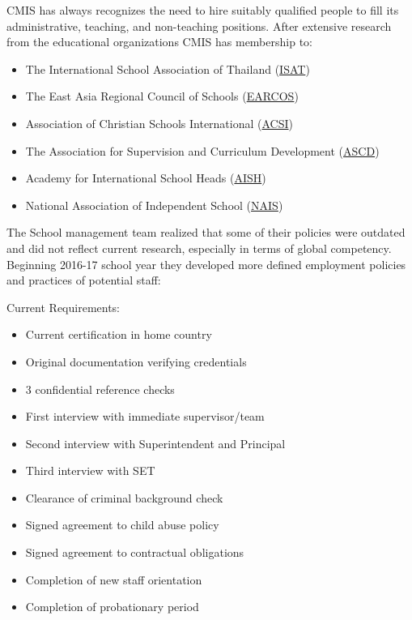 \begin{findings}
CMIS has always recognizes the need to hire suitably qualified people to fill its administrative, teaching, and non-teaching positions. After extensive research from the educational organizations CMIS has membership to:

\begin{itemize}
\item The International School Association of Thailand (\href{http://gallery.cmis.ac.th/2016-2017/ISAT-Regional-Meeting/}{ISAT})
\item The East Asia Regional Council of Schools (\href{https://www.earcos.org/}{EARCOS})
\item Association of Christian Schools International (\href{https://www.acsi.org/}{ACSI})
\item The Association for Supervision and Curriculum Development (\href{http://www.ascd.org/about-ascd.aspx}{ASCD})
\item Academy for International School Heads (\href{http://aishbank.squarespace.com/}{AISH})
\item National Association of Independent School (\href{http://www.nais.org/Pages/default.aspx}{NAIS}) 
\end{itemize}

The School management team realized that some of their policies were outdated and did not reflect current research, especially in terms of global competency. Beginning 2016-17 school year they developed more defined employment policies and practices of potential staff:

Current Requirements:
\begin{itemize}
\item Current certification in home country
\item Original documentation verifying credentials
\item 3 confidential reference checks
\item First interview with immediate supervisor/team
\item Second interview with Superintendent and Principal
\item Third interview with SET
\item Clearance of criminal background check
\item Signed agreement to child abuse policy
\item Signed agreement to contractual obligations
\item Completion of new staff orientation
\item Completion of probationary period
\end{itemize}


\end{findings}
